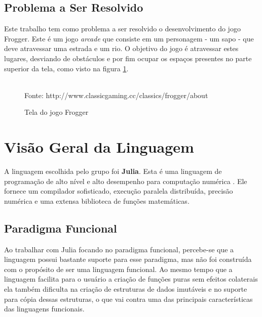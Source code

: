 \documentclass[rel_mlp]{iiufrgs}
\newcommand{\fonte}[1]{\\Fonte: {#1}}
\begin{document}
\section{Problema a Ser Resolvido}

Este trabalho tem como problema a ser resolvido o desenvolvimento do jogo Frogger. Este é um jogo \textit{arcade} que consiste em um personagem - um sapo - que deve atravessar uma estrada e um rio. O objetivo do jogo é atravessar estes lugares, desviando de obstáculos e por fim ocupar os espaços presentes no parte superior da tela, como visto na figura \ref{fig:figura1}.

 \begin{figure}[htb]
     \centering
     \caption{Tela do jogo Frogger}
     \label{fig:figura1}
     \fonte{http://www.classicgaming.cc/classics/frogger/about}
 \end{figure}
 
 \chapter{Visão Geral da Linguagem}
 
 A linguagem escolhida pelo grupo foi \textbf{Julia}. Esta é uma linguagem de programação de alto nível e alto desempenho para computação numérica \cite{TJL}. Ele fornece um compilador sofisticado, execução paralela distribuída, precisão numérica e uma extensa biblioteca de funções matemáticas.
 
 \section{Paradigma Funcional}
 
 Ao trabalhar com Julia focando no paradigma funcional, percebe-se que a linguagem possui bastante suporte para esse paradigma, mas não foi construída com o propósito de ser uma linguagem funcional. Ao mesmo tempo que a linguagem facilita para o usuário a criação de funções puras sem efeitos colaterais ela também dificulta na criação de estruturas de dados imutáveis e no suporte para cópia dessas estruturas, o que vai contra uma das principais características das linguagens funcionais.
 
\end{document}
